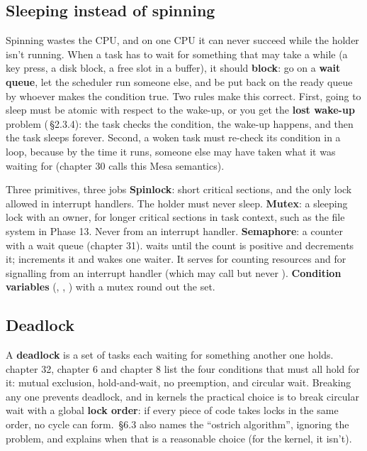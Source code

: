 \documentclass[11pt,a4paper]{article}
\begin{document}
\subsection{Sleeping instead of spinning}

Spinning wastes the CPU, and on one CPU it can never succeed while the holder isn't running. When a task has to wait
for something that may take a while (a key press, a disk block, a free slot in a buffer), it should \textbf{block}:
go on a \textbf{wait queue}, let the scheduler run someone else, and be put back on the ready queue by whoever
makes the condition true. Two rules make this correct. First, going to sleep must be atomic with respect to the
wake-up, or you get the \textbf{lost wake-up} problem (\MOS\,\S2.3.4): the task checks the condition, the wake-up
happens, and then the task sleeps forever. Second, a woken task must re-check its condition in a  loop,
because by the time it runs, someone else may have taken what it was waiting for (\OSTEP chapter 30 calls this Mesa
semantics).

\begin{conceptbox}{Three primitives, three jobs}
\textbf{Spinlock}: short critical sections, and the only lock allowed in interrupt handlers. The holder must never
sleep. \textbf{Mutex}: a sleeping lock with an owner, for longer critical sections in task context, such as the
file system in Phase 13. Never from an interrupt handler. \textbf{Semaphore}: a counter with a wait queue
(\OSTEP chapter 31).  waits until the count is positive and decrements it;  increments it and
wakes one waiter. It serves for counting resources and for signalling from an interrupt handler (which may call
 but never ). \textbf{Condition variables} (, , ) with a
mutex round out the set.
\end{conceptbox}

\subsection{Deadlock}

A \textbf{deadlock} is a set of tasks each waiting for something another one holds. \OSTEP chapter 32, \MOS chapter 6
and \OSC chapter 8 list the four conditions that must all hold for it: mutual exclusion, hold-and-wait, no preemption,
and circular wait. Breaking any one prevents deadlock, and in kernels the practical choice is to break circular wait
with a global \textbf{lock order}: if every piece of code takes locks in the same order, no cycle can form. \MOS\,\S6.3
also names the ``ostrich algorithm'', ignoring the problem, and explains when that is a reasonable choice (for the
kernel, it isn't).
\end{document}
